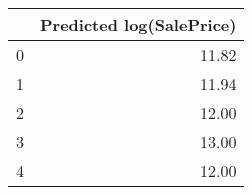 \begin{tabular}{lr}
\toprule
{} &  Predicted log(SalePrice) \\
\midrule
0 &                     11.82 \\
1 &                     11.94 \\
2 &                     12.00 \\
3 &                     13.00 \\
4 &                     12.00 \\
\bottomrule
\end{tabular}
